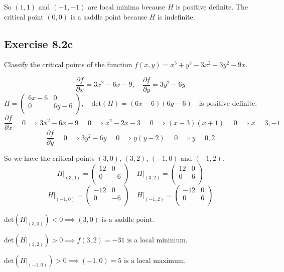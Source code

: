 \documentclass[11pt]{article}
\begin{document}
So $(1,1)$ and $(-1,-1)$ are local minima because $H$ is positive definite. The critical point $(0,0)$ is a saddle point because $H$ is indefinite.

\subsection*{Exercise 8.2c}
Classify the critical points of the function $f(x,y) = x^3+y^3-3 x^2-3 y^2-9 x$.

\[
\frac{\partial f}{\partial x} = 3x^2 - 6x - 9, \quad \frac{\partial f}{\partial y} = 3y^2 - 6y
\]
\[
H = \begin{pmatrix}
    6x - 6 & 0 \\
    0 & 6y - 6 \\
\end{pmatrix}, \quad \text{det}(H) = (6x - 6)(6y - 6) \quad \text{is positive definite.}
\]
\[
\frac{\partial f}{\partial x} = 0 \implies 3x^2 - 6x - 9 = 0 \implies x^2 - 2x - 3 = 0 \implies (x - 3)(x + 1) = 0 \implies x = 3, -1
\]
\[
\frac{\partial f}{\partial y} = 0 \implies 3y^2 - 6y = 0 \implies y(y - 2) = 0 \implies y = 0, 2
\]

So we have the critical points $(3,0)$, $(3,2)$, $(-1,0)$ and $(-1,2)$.
\[
H\big|_{(3,0)} = \begin{pmatrix}
    12 & 0 \\
    0 & -6 \\
\end{pmatrix} \quad H\big|_{(3,2)} = \begin{pmatrix}
    12 & 0 \\
    0 & 6 \\
\end{pmatrix}
\]
\[
H\big|_{(-1,0)} = \begin{pmatrix}
    -12 & 0 \\
    0 & -6 \\
\end{pmatrix} \quad H\big|_{(-1,2)} = \begin{pmatrix}
    -12 & 0 \\
    0 & 6 \\
\end{pmatrix}
\]

$\text{det}(H\big|_{(3,0)}) < 0 \implies (3,0) \text{ is a saddle point.}$

$\text{det}(H\big|_{(3,2)}) > 0 \implies f(3,2) = -31 \text{ is a local minimum.}$

$\text{det}(H\big|_{(-1,0)}) > 0 \implies (-1,0) = 5 \text{ is a local maximum.}$
\end{document}
